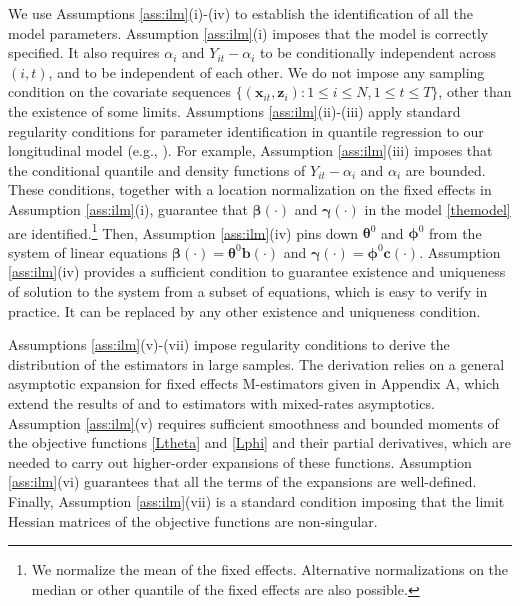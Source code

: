 \documentclass[12pt]{article}
\def\thetavec{\bm{\theta}}
\def\phivec{\bm{\phi}}
\def\betavec{\bm{\beta}}
\def\gammavec{\bm{\gamma}}
\def\xx{\bm{x}}
\def\zz{\bm{z}}
\def\bvec{\bm{b}}
\def\cvec{\bm{c}}
\begin{document}
We use Assumptions \ref{ass:ilm}(i)-(iv) to establish the identification of all the model parameters.  Assumption \ref{ass:ilm}(i) imposes that the model is correctly specified. It also requires $\alpha_i$ and $Y_{it} - \alpha_i$ to be conditionally 
independent across $(i,t)$, and to be independent of each other. We do not impose any sampling condition on the covariate sequences $\{(\xx_{it}, \zz_i) : 1 \leq i \leq N, 1 \leq t \leq T \}$, other than the existence of some limits.  Assumptions \ref{ass:ilm}(ii)-(iii) apply standard regularity conditions for parameter  identification in quantile regression to our longitudinal model (e.g., \citealp{ACF06}). For example, Assumption \ref{ass:ilm}(iii) imposes that the conditional quantile and density functions of $Y_{it} - \alpha_i$ and $\alpha_i$ are bounded. These conditions, together with a location normalization on the fixed effects in Assumption \ref{ass:ilm}(i), guarantee that $\betavec(\cdot)$ and $\gammavec(\cdot)$ in the model \eqref{themodel} are identified.\footnote{We normalize  the mean of the fixed effects. Alternative  normalizations on the median or other quantile of the fixed effects are also possible.}  Then, Assumption \ref{ass:ilm}(iv)  pins down $\thetavec^0$ and $\phivec^0$ from the system of linear equations $\betavec(\cdot) = \thetavec^0 \bvec(\cdot)$ and $\gammavec(\cdot) = \phivec^0 \cvec(\cdot)$. Assumption \ref{ass:ilm}(iv) provides a sufficient condition to guarantee  existence and uniqueness of solution to the system from a subset of equations, which  is easy to verify in practice. It can be replaced by any other existence and uniqueness condition.


Assumptions \ref{ass:ilm}(v)-(vii)  impose regularity conditions to derive the distribution of the estimators in large samples. The derivation relies on a general asymptotic expansion for fixed effects M-estimators given in Appendix A, which extend the results of \cite{hn} and \cite{fv} to estimators with mixed-rates asymptotics.  Assumption \ref{ass:ilm}(v) requires sufficient smoothness and bounded moments of the objective functions \eqref{Ltheta} and \eqref{Lphi} and their partial derivatives, which are needed to carry out  higher-order  expansions of these functions. Assumption \ref{ass:ilm}(vi) guarantees that all the terms of the  expansions are well-defined. Finally, Assumption   \ref{ass:ilm}(vii) is a standard condition imposing that the limit Hessian matrices of the objective functions are non-singular. 
\end{document}
